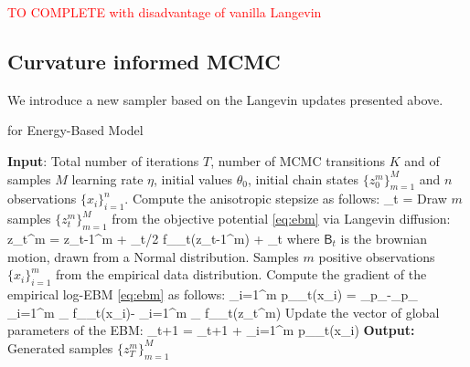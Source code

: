 \documentclass{article}
\begin{document}
\textcolor{red}{TO COMPLETE with disadvantage of vanilla Langevin}

\subsection{Curvature informed MCMC}

We introduce a new sampler based on the Langevin updates presented above.

\begin{algorithm}[H]
\caption{\algo for Energy-Based Model} \label{alg:anila}
\begin{algorithmic}[1]
\STATE \textbf{Input}: Total number of iterations $T$, number of MCMC transitions $K$ and of samples $M$ learning rate $\eta$, initial values $\theta_0$, initial chain states $\{ z_{0}^m \}_{m=1}^M$ and $n$ observations $\{ x_{i} \}_{i=1}^n$.
\STATE Compute the anisotropic stepsize as follows: \label{line:step}
\beq\label{eq:step}
\stepsize_t = 
\eeq
\STATE Draw $m$ samples $\{ z_{t}^m \}_{m=1}^M$ from the objective potential \eqref{eq:ebm} via Langevin diffusion:\label{line:langevin}
\beq\label{eq:anila}
z_{t}^{m} = z_{t-1}^m + \stepsize_t/2  \nabla f_{\theta_t}(z_{t-1}^m) +  _t
\eeq
where $\mathsf{B}_t$ is the brownian motion, drawn from a Normal distribution.
\STATE Samples $m$ positive observations $\{ x_{i} \}_{i=1}^m$ from the empirical data distribution.
\STATE Compute the gradient of the empirical log-EBM \eqref{eq:ebm} as follows:
\beq
\nabla \sum_{i=1}^m \log p_{\theta_t}(x_i) = _{p_{}}-_{p_{\theta}} \approx {} \sum_{i=1}^{m} \nabla_{\theta} f_{\theta_t}\left(x_{i}\right)- \sum_{i=1}^{m} \nabla_{\theta} f_{\theta_t}\left(z_t^m\right)
\eeq
\STATE Update the vector of global parameters of the EBM:
\beq
\theta_{t+1} = \theta_{t+1} + \eta \nabla \sum_{i=1}^m \log p_{\theta_t}(x_i)
\eeq
\ENDFOR
\STATE \textbf{Output:} Generated samples $\{ z_{T}^m \}_{m=1}^M$
\end{algorithmic}
\end{algorithm}
\end{document}
